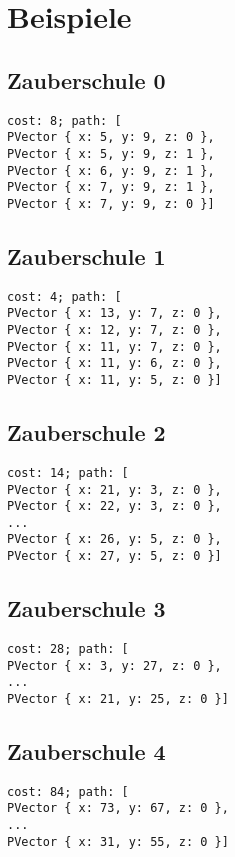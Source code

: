 \section{Beispiele}
\subsection{Zauberschule 0}

\begin{verbatim}
cost: 8; path: [
PVector { x: 5, y: 9, z: 0 },
PVector { x: 5, y: 9, z: 1 },
PVector { x: 6, y: 9, z: 1 },
PVector { x: 7, y: 9, z: 1 },
PVector { x: 7, y: 9, z: 0 }]
\end{verbatim}

\subsection{Zauberschule 1}

\begin{verbatim}
cost: 4; path: [
PVector { x: 13, y: 7, z: 0 },
PVector { x: 12, y: 7, z: 0 },
PVector { x: 11, y: 7, z: 0 },
PVector { x: 11, y: 6, z: 0 },
PVector { x: 11, y: 5, z: 0 }]
\end{verbatim}

\subsection{Zauberschule 2}

\begin{verbatim}
cost: 14; path: [
PVector { x: 21, y: 3, z: 0 },
PVector { x: 22, y: 3, z: 0 },
...
PVector { x: 26, y: 5, z: 0 },
PVector { x: 27, y: 5, z: 0 }]
\end{verbatim}

\subsection{Zauberschule 3}

\begin{verbatim}
cost: 28; path: [
PVector { x: 3, y: 27, z: 0 },
...
PVector { x: 21, y: 25, z: 0 }]
\end{verbatim}

\subsection{Zauberschule 4}

\begin{verbatim}
cost: 84; path: [
PVector { x: 73, y: 67, z: 0 },
...
PVector { x: 31, y: 55, z: 0 }]
\end{verbatim}


